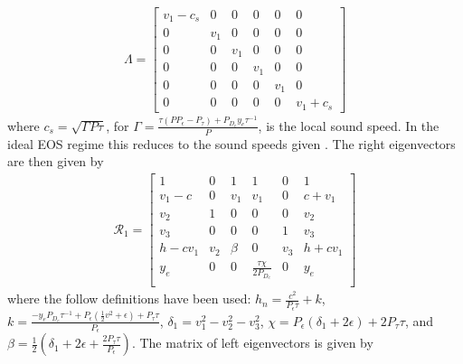\documentclass[onecolumn]{aastex62}
\begin{document}
\begin{align}
\Lambda =
\begin{bmatrix}
  v_{1} - c_{s} & 0 & 0& 0& 0& 0 \\
  0 & v_{1} & 0 & 0 & 0 & 0      \\
  0 & 0 & v_{1} & 0 & 0 & 0      \\
  0 & 0 & 0 & v_{1} & 0 & 0      \\
  0 & 0 & 0 & 0 & v_{1} & 0      \\
  0 & 0 & 0 & 0 & 0 & v_{1} + c_{s}
\end{bmatrix}
\end{align}
where $c_{s} = \sqrt{\Gamma P \tau}$, for
$\Gamma = \frac{\tau (P P_{\epsilon} - P_{\tau}) + P_{D_e} y_{e} \tau^{-1}}{P}$, is
the local sound speed. In the ideal EOS regime this reduces to the sound speeds given \citet{colella:1985}.
The right eigenvectors are then given by
\begin{align*}
  \mathcal{R}_{1} =
  \left[
  \begin{array}{cccccc}
   1 & 0 & 1 & 1 & 0 & 1 \\
   v_{1}-c & 0 & v_{1} & v_{1} & 0 & c+v_{1} \\
   v_{2} & 1 & 0 & 0 & 0 & v_{2} \\
   v_{3} & 0 & 0 & 0 & 1 & v_{3} \\
   h-c v_{1} & v_{2} & \beta & 0 & v_{3} & h+c v_{1} \\
   y_{e}  & 0 & 0 & \frac{\tau  \chi }{2 P_{D_{e}}} & 0 & y_{e}  \\
  \end{array}
  \right]
\end{align*}
where the follow definitions have been used:
$h_{n} = \frac{c^2}{P_{\epsilon}\tau} + k $, $k = \frac{-y_{e} P_{D_{e}} \tau^{-1}
+ P_{\epsilon} (\frac{1}{2}v^2 + \epsilon) + P_{\tau}\tau}{P_{\epsilon}}$,
$\delta_{1} = v_{1}^{2}-v_{2}^{2}-v_{3}^{2}$,
$\chi = P_{\epsilon} ( \delta_{1} + 2\epsilon) + 2P_{\tau}\tau$, and
$\beta = \frac{1}{2} (\delta_{1}+2 \epsilon +\frac{2 P_{\tau} \tau }{P_{\epsilon}})$.
The matrix of left eigenvectors is given by
\end{document}
